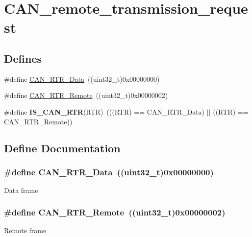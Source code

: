 \hypertarget{group__CAN__remote__transmission__request}{
\section{CAN\_\-remote\_\-transmission\_\-request}
\label{group__CAN__remote__transmission__request}
}
\subsection*{Defines}
\begin{DoxyCompactItemize}
\item 
\#define \hyperlink{group__CAN__remote__transmission__request_ga2407c3a8b2cd97bd651143aa959219f1}{CAN\_\-RTR\_\-Data}~((uint32\_\-t)0x00000000)
\item 
\#define \hyperlink{group__CAN__remote__transmission__request_ga42e95ddfb02d88c82de84058fb0fb349}{CAN\_\-RTR\_\-Remote}~((uint32\_\-t)0x00000002)
\item 
\hypertarget{group__CAN__remote__transmission__request_ga3379997ad4da6fc4d7975c52b891bdc0}{
\#define {\bfseries IS\_\-CAN\_\-RTR}(RTR)~(((RTR) == CAN\_\-RTR\_\-Data) $|$$|$ ((RTR) == CAN\_\-RTR\_\-Remote))}
\label{group__CAN__remote__transmission__request_ga3379997ad4da6fc4d7975c52b891bdc0}

\end{DoxyCompactItemize}


\subsection{Define Documentation}
\hypertarget{group__CAN__remote__transmission__request_ga2407c3a8b2cd97bd651143aa959219f1}{
\subsubsection[{CAN\_\-RTR\_\-Data}]{\setlength{\rightskip}{0pt plus 5cm}\#define CAN\_\-RTR\_\-Data~((uint32\_\-t)0x00000000)}}
\label{group__CAN__remote__transmission__request_ga2407c3a8b2cd97bd651143aa959219f1}
Data frame \hypertarget{group__CAN__remote__transmission__request_ga42e95ddfb02d88c82de84058fb0fb349}{
\subsubsection[{CAN\_\-RTR\_\-Remote}]{\setlength{\rightskip}{0pt plus 5cm}\#define CAN\_\-RTR\_\-Remote~((uint32\_\-t)0x00000002)}}
\label{group__CAN__remote__transmission__request_ga42e95ddfb02d88c82de84058fb0fb349}
Remote frame 